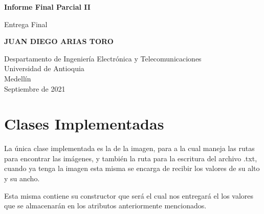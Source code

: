 \documentclass{article}
\begin{document}
\begin{titlepage}
    \begin{center}
        \vspace*{1cm}
            
        \Huge
        \textbf{Informe Final Parcial II}
            
        \vspace{0.5cm}
        \LARGE
        Entrega Final
            
        \vspace{1.5cm}
            
        \textbf{JUAN DIEGO ARIAS TORO}
            
        \vfill
            
        \vspace{0.8cm}
            
        \Large
        Despartamento de Ingeniería Electrónica y Telecomunicaciones\\
        Universidad de Antioquia\\
        Medellín\\
        Septiembre de 2021
            
    \end{center}
\end{titlepage}

\tableofcontents
\newpage
\section{Clases Implementadas}\label{intro}
La única clase implementada es la de la imagen, para a la cual maneja las rutas para encontrar las imágenes, y también la ruta para la escritura del archivo .txt, cuando ya tenga la imagen esta misma se encarga de recibir los valores de su alto y su ancho.

Esta misma contiene su constructor que será el cual nos entregará el los valores que se almacenarán en los atributos anteriormente mencionados.
\end{document}
